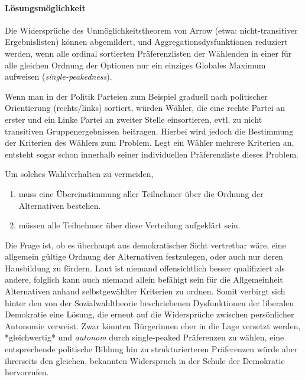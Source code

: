 \paragraph{Lösungsmöglichkeit}

Die Widersprüche des Unmöglichkeitstheorem von Arrow (etwa: nicht-transitiver Ergebnislisten) können abgemildert, und Aggregationsdysfunktionen reduziert werden, wenn alle ordinal sortierten Präferenzlisten der Wählenden in einer für alle gleichen Ordnung der Optionen nur ein einziges Globales Maximum aufweisen (\emph{single-peakedness}).

Wenn man in der Politik Parteien zum Beispiel graduell nach politischer Orientierung (rechts/links) sortiert, würden Wähler, die eine rechte Partei an erster und ein Linke Partei an zweiter Stelle einsortieren, evtl. zu nicht transitiven Gruppenergebnissen beitragen.
Hierbei wird jedoch die Bestimmung der Kriterien des Wählers zum Problem.
Legt ein Wähler mehrere Kriterien an, entsteht sogar schon innerhalb seiner individuellen Präferenzliste dieses Problem.

Um solches Wahlverhalten zu vermeiden,
	\begin{enumerate}
		\item muss eine Übereinstimmung aller Teilnehmer über die Ordnung der Alternativen bestehen.

		\item müssen alle Teilnehmer über diese Verteilung aufgeklärt sein.
	\end{enumerate}

Die Frage ist, ob es überhaupt aus demokratischer Sicht vertretbar wäre, eine allgemein gültige Ordnung der Alternativen festzulegen, oder auch nur deren Hausbildung zu fördern.
Laut \citeauthor{Dahl-1989-aa} ist niemand offensichtlich besser qualifiziert als andere, folglich kann auch niemand allein befähigt sein für die Allgemeinheit Alternativen anhand selbstgewählter Kriterien zu ordnen.
Somit verbirgt sich hinter den von der Sozialwahltheorie beschriebenen Dysfunktionen der liberalen Demokratie eine Lösung, die erneut auf die Widersprüche zwischen persönlicher Autonomie verweist.
Zwar könnten Bürgerinnen eher in die Lage versetzt werden, *gleichwertig* und \emph{autonom} durch single-peaked Präferenzen zu wählen, eine entsprechende politische Bildung hin zu strukturierteren Präferenzen würde aber ihrerseits den gleichen, bekannten Widerspruch in der Schule der Demokratie hervorrufen.
